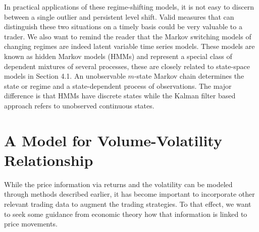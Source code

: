 In practical applications of these regime-shifting models, it is not easy to discern between a single outlier and persistent level shift. Valid measures that can distinguish these two situations on a timely basis could be very valuable to a trader. We also want to remind the reader that the Markov switching models of changing regimes are indeed latent variable time series models. These models are known as hidden Markov models (HMMs) and represent a special class of dependent mixtures of several processes, these are closely related to state-space models in Section 4.1. An unobservable $m$-state Markov chain determines the state or regime and a state-dependent process of observations. The major difference is that HMMs have discrete states while the Kalman filter based approach refers to unobserved continuous states. 


\section{A Model for Volume-Volatility Relationship}


While the price information via returns and the volatility can be modeled through methods described earlier, it has become important to incorporate other relevant trading data to augment the trading strategies. To that effect, we want to seek some guidance from economic theory how that information is linked to price movements.

